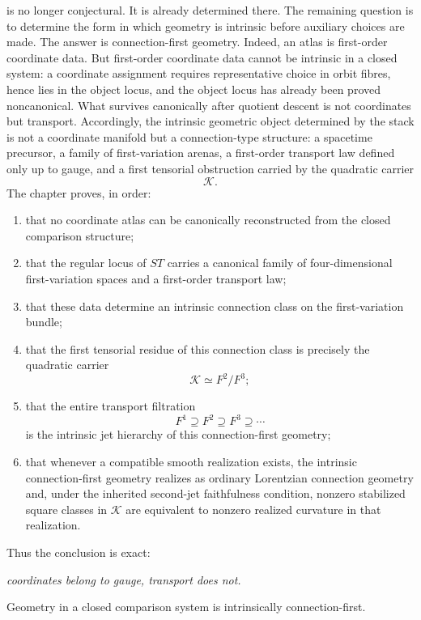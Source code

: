 is no longer conjectural.  It is already determined there.  The
remaining question is to determine the form in which geometry is
intrinsic before auxiliary choices are made.
The answer is connection-first geometry.
Indeed, an atlas is first-order coordinate data.  But first-order
coordinate data cannot be intrinsic in a closed system: a coordinate
assignment requires representative choice in orbit fibres, hence lies in
the object locus, and the object locus has already been proved
noncanonical.  What survives canonically after quotient descent is not
coordinates but transport.  Accordingly, the intrinsic geometric object
determined by the stack is not a coordinate manifold but a connection-type
structure: a spacetime precursor, a family of first-variation arenas, a
first-order transport law defined only up to gauge, and a first
tensorial obstruction carried by the quadratic carrier
\[
	\mathcal K.
\]
The chapter proves, in order:
\begin{enumerate}[label=\textup{(\roman*)}]
	\item
	      that no coordinate atlas can be canonically reconstructed from the
	      closed comparison structure;
	\item
	      that the regular locus of \(ST\) carries a canonical family of
	      four-dimensional first-variation spaces and a first-order transport law;
	\item
	      that these data determine an intrinsic connection class on the
	      first-variation bundle;
	\item
	      that the first tensorial residue of this connection class is precisely
	      the quadratic carrier
	      \[
		      \mathcal K\simeq F^2/F^3;
	      \]
	\item
	      that the entire transport filtration
	      \[
		      F^1\supseteq F^2\supseteq F^3\supseteq\cdots
	      \]
	      is the intrinsic jet hierarchy of this connection-first geometry;
	\item
	      that whenever a compatible smooth realization exists, the intrinsic
	      connection-first geometry realizes as ordinary Lorentzian connection
	      geometry and, under the inherited second-jet faithfulness condition,
	      nonzero stabilized square classes in \(\mathcal K\) are equivalent
	      to nonzero realized curvature in that realization.
\end{enumerate}
Thus the conclusion is exact:
\medskip
\begin{center}
	\emph{coordinates belong to gauge, transport does not.}
\end{center}
\medskip
Geometry in a closed comparison system is intrinsically
connection-first.

